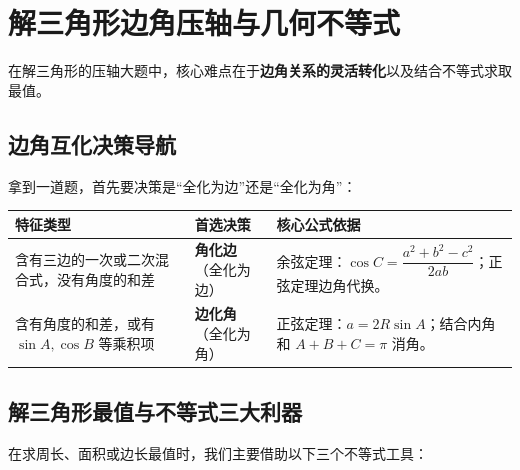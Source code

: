 \documentclass[11pt,a4paper]{ctexart}
\begin{document}
\newpage

\section{解三角形边角压轴与几何不等式}

在解三角形的压轴大题中，核心难点在于\textbf{边角关系的灵活转化}以及结合不等式求取最值。

\subsection{边角互化决策导航}
拿到一道题，首先要决策是“全化为边”还是“全化为角”：

\begin{center}
\renewcommand{\arraystretch}{1.3}
\begin{tabularx}{\linewidth}{p{4.0cm} p{4.0cm} X}
\toprule
\textbf{特征类型} & \textbf{首选决策} & \textbf{核心公式依据} \\
\midrule
含有三边的一次或二次混合式，没有角度的和差 & \textbf{角化边}（全化为边） & 余弦定理：$\cos C = \dfrac{a^2+b^2-c^2}{2ab}$；正弦定理边角代换。 \\
含有角度的和差，或有 $\sin A, \cos B$ 等乘积项 & \textbf{边化角}（全化为角） & 正弦定理：$a = 2R\sin A$；结合内角和 $A+B+C=\pi$ 消角。 \\
\bottomrule
\end{tabularx}
\end{center}

\subsection{解三角形最值与不等式三大利器}
在求周长、面积或边长最值时，我们主要借助以下三个不等式工具：
\end{document}
